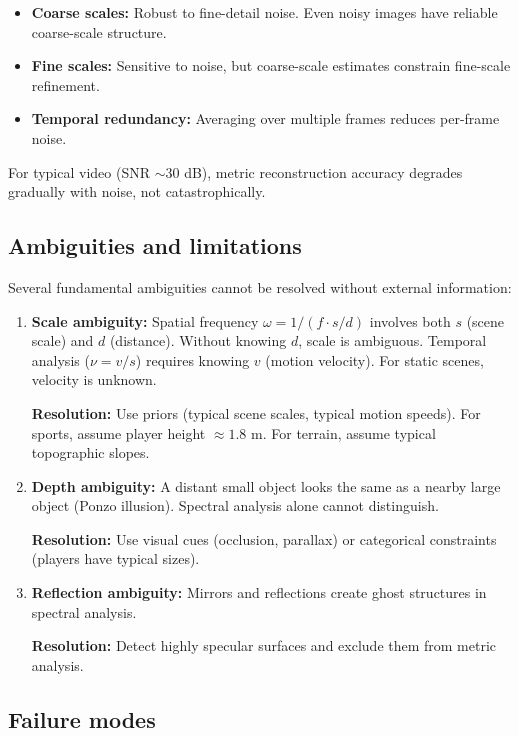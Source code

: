 \documentclass[11pt,twocolumn,a4paper]{article}
\theoremstyle{definition}
\begin{document}
\begin{itemize}
  \item \textbf{Coarse scales:} Robust to fine-detail noise. Even noisy images have reliable coarse-scale structure.
  \item \textbf{Fine scales:} Sensitive to noise, but coarse-scale estimates constrain fine-scale refinement.
  \item \textbf{Temporal redundancy:} Averaging over multiple frames reduces per-frame noise.
\end{itemize}

For typical video (SNR $\sim 30$ dB), metric reconstruction accuracy degrades gradually with noise, not catastrophically.

\subsection{Ambiguities and limitations}

Several fundamental ambiguities cannot be resolved without external information:

\begin{enumerate}[leftmargin=1.4em]
  \item \textbf{Scale ambiguity:} Spatial frequency $\omega = 1/(f \cdot s/d)$ involves both $s$ (scene scale) and $d$ (distance). Without knowing $d$, scale is ambiguous. Temporal analysis ($\nu = v/s$) requires knowing $v$ (motion velocity). For static scenes, velocity is unknown.

  \textbf{Resolution:} Use priors (typical scene scales, typical motion speeds). For sports, assume player height $\approx 1.8$ m. For terrain, assume typical topographic slopes.

  \item \textbf{Depth ambiguity:} A distant small object looks the same as a nearby large object (Ponzo illusion). Spectral analysis alone cannot distinguish.

  \textbf{Resolution:} Use visual cues (occlusion, parallax) or categorical constraints (players have typical sizes).

  \item \textbf{Reflection ambiguity:} Mirrors and reflections create ghost structures in spectral analysis.

  \textbf{Resolution:} Detect highly specular surfaces and exclude them from metric analysis.
\end{enumerate}

\subsection{Failure modes}
\end{document}
